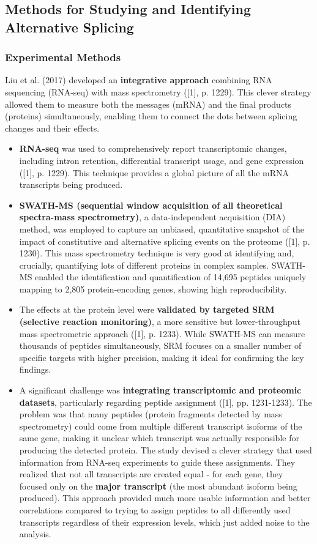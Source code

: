 \documentclass[12pt,a4paper]{article}
\begin{document}
\subsection{Methods for Studying and Identifying Alternative Splicing}

\subsubsection{Experimental Methods}

Liu et al. (2017) developed an \textbf{integrative approach} combining RNA sequencing (RNA-seq) with mass spectrometry ([1], p. 1229). This clever strategy allowed them to measure both the messages (mRNA) and the final products (proteins) simultaneously, enabling them to connect the dots between splicing changes and their effects.
\begin{itemize}
    \item \textbf{RNA-seq} was used to comprehensively report transcriptomic changes, including intron retention, differential transcript usage, and gene expression ([1], p. 1229). This technique provides a global picture of all the mRNA transcripts being produced.
    \item \textbf{SWATH-MS (sequential window acquisition of all theoretical spectra-mass spectrometry)}, a data-independent acquisition (DIA) method, was employed to capture an unbiased, quantitative snapshot of the impact of constitutive and alternative splicing events on the proteome ([1], p. 1230). This mass spectrometry technique is very good at identifying and, crucially, quantifying lots of different proteins in complex samples. SWATH-MS enabled the identification and quantification of 14,695 peptides uniquely mapping to 2,805 protein-encoding genes, showing high reproducibility.
    \item The effects at the protein level were \textbf{validated by targeted SRM (selective reaction monitoring)}, a more sensitive but lower-throughput mass spectrometric approach ([1], p. 1233). While SWATH-MS can measure thousands of peptides simultaneously, SRM focuses on a smaller number of specific targets with higher precision, making it ideal for confirming the key findings.
    \item A significant challenge was \textbf{integrating transcriptomic and proteomic datasets}, particularly regarding peptide assignment ([1], pp. 1231-1233). The problem was that many peptides (protein fragments detected by mass spectrometry) could come from multiple different transcript isoforms of the same gene, making it unclear which transcript was actually responsible for producing the detected protein. The study devised a clever strategy that used information from RNA-seq experiments to guide these assignments. They realized that not all transcripts are created equal - for each gene, they focused only on the \textbf{major transcript} (the most abundant isoform being produced). This approach provided much more usable information and better correlations compared to trying to assign peptides to all differently used transcripts regardless of their expression levels, which just added noise to the analysis.
\end{itemize}
\end{document}
